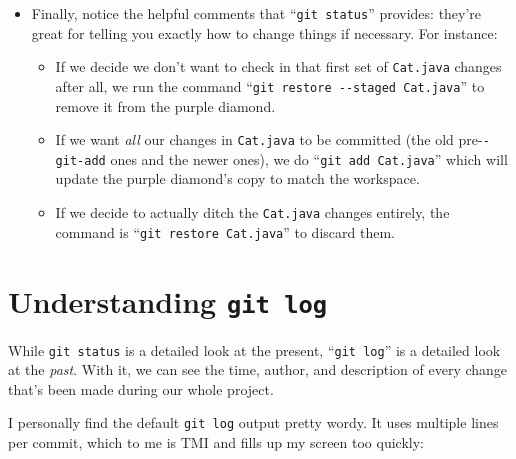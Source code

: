 \begin{itemize}
\item Finally, notice the helpful comments that ``\texttt{git status}''
provides: they're great for telling you exactly how to change things if
necessary. For instance:

\begin{itemize}

\item If we decide we don't want to check in that first set of
\texttt{Cat.java} changes after all, we run the command ``\texttt{git restore
-{}-staged Cat.java}'' to remove it from the purple diamond.

\item If we want \textit{all} our changes in \texttt{Cat.java} to be committed
(the old pre-\texttt{-git-add} ones and the newer ones), we do ``\texttt{git
add Cat.java}'' which will update the purple diamond's copy to match the
workspace.

\item If we decide to actually ditch the \texttt{Cat.java} changes entirely,
the command is ``\texttt{git restore Cat.java}'' to discard them. \label{gitRestore}

\end{itemize}

\end{itemize}

\section{Understanding \texttt{git log}}

While \texttt{git status} is a detailed look at the present, ``\texttt{git
log}'' is a detailed look at the \textit{past}. With it, we can see the time,
author, and description of every change that's been made during our whole
project.

I personally find the default \texttt{git log} output pretty wordy. It uses
multiple lines per commit, which to me is TMI and fills up my screen too
quickly:

